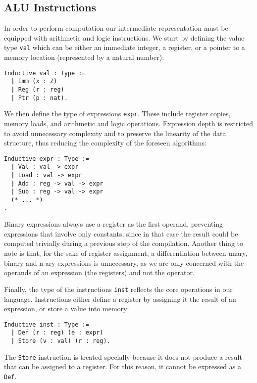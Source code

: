 \subsection{ALU Instructions}

In order to perform computation our intermediate representation must be equipped with arithmetic and logic instructions.
We start by defining the value type \texttt{val} which can be either an immediate integer, a register, or a pointer to a memory location (represented by a natural number):

\begin{lstlisting}[style=Coq]
Inductive val : Type :=
  | Imm (x : Z)
  | Reg (r : reg)
  | Ptr (p : nat).
\end{lstlisting}

We then define the type of expressions \texttt{expr}. These include register copies, memory loads, and arithmetic and logic operations. Expression depth is restricted to avoid unnecessary complexity and to preserve the linearity of the data structure, thus reducing the complexity of the foreseen algorithms:

\begin{lstlisting}[style=Coq]
Inductive expr : Type :=
  | Val : val -> expr
  | Load : val -> expr
  | Add : reg -> val -> expr
  | Sub : reg -> val -> expr
  (* ... *)
.
\end{lstlisting}

Binary expressions always use a register as the first operand, preventing expressions that involve only constants, since in that case the result could be computed trivially during a previous step of the compilation. Another thing to note is that, for the sake of register assignment, a differentiation between unary, binary and n-ary expressions is unnecessary, as we are only concerned with the operands of an expression (the registers) and not the operator.

Finally, the type of the instructions \texttt{inst} reflects the core operations in our language. Instructions either define a register by assigning it the result of an expression, or store a value into memory:

\begin{lstlisting}[style=Coq]
Inductive inst : Type :=
  | Def (r : reg) (e : expr)
  | Store (v : val) (r : reg).
\end{lstlisting}

The \texttt{Store} instruction is treated specially because it does not produce a result that can be assigned to a register. For this reason, it cannot be expressed as a \texttt{Def}.

